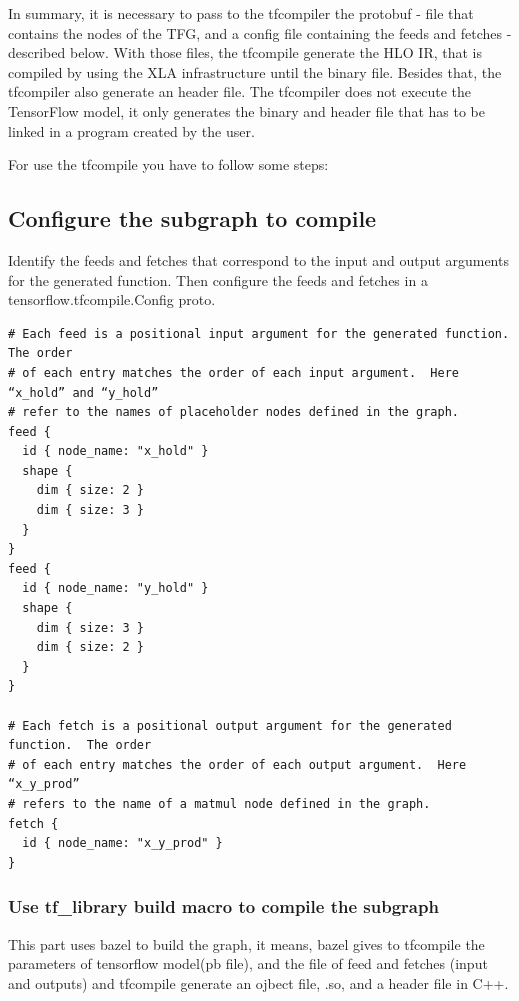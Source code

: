 \documentclass[11pt, fleqn]{article}
\begin{document}
In summary, it is necessary to pass to the tfcompiler the protobuf - file that contains the nodes of the TFG, and a config file containing the feeds and fetches - described below. With those files, the tfcompile generate the HLO IR, that is compiled by using the XLA infrastructure until the binary file. Besides that, the tfcompiler also generate an header file. The tfcompiler does not execute the TensorFlow model, it only generates the binary and header file that has to be linked in a program created by the user. 

For use the tfcompile you have to follow some steps:

\subsection{Configure the subgraph to compile}

Identify the feeds and fetches that correspond to the input and output arguments for the generated function. Then configure the feeds and fetches in a tensorflow.tfcompile.Config proto.

\begin{verbatim}
# Each feed is a positional input argument for the generated function.  The order
# of each entry matches the order of each input argument.  Here “x_hold” and “y_hold”
# refer to the names of placeholder nodes defined in the graph.
feed {
  id { node_name: "x_hold" }
  shape {
    dim { size: 2 }
    dim { size: 3 }
  }
}
feed {
  id { node_name: "y_hold" }
  shape {
    dim { size: 3 }
    dim { size: 2 }
  }
}

# Each fetch is a positional output argument for the generated function.  The order
# of each entry matches the order of each output argument.  Here “x_y_prod”
# refers to the name of a matmul node defined in the graph.
fetch {
  id { node_name: "x_y_prod" }
}
\end{verbatim}


\subsubsection{Use tf\_library build macro to compile the subgraph}

This part uses bazel to build the graph, it means, bazel gives to tfcompile the parameters of tensorflow model(pb file), and the file of feed and fetches (input and outputs) and tfcompile generate an ojbect file, .so, and a header file in C++.
\end{document}

